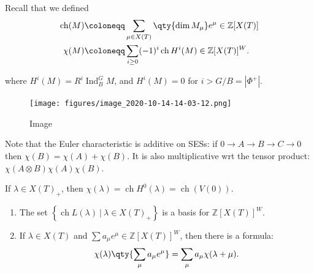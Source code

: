 Recall that we defined
\begin{align*}  
\operatorname{ch}(M) &\coloneqq\sum_{\mu \in X(T)} \qty{\dim M_\mu} e^{\mu} \in {\mathbb{Z}}[X(T)]\\
\chi(M) &\coloneqq\sum_{i\geq 0} (-1)^i \operatorname{ch}H^i(M) \in {\mathbb{Z}}[X(T)]^W
.\end{align*}

where \(H^i(M) = R^i \operatorname{Ind}_B^G M\), and \(H^i(M) =0\) for
\(i> G/B = {\left\lvert {\Phi^+} \right\rvert}\).

\begin{figure}
\centering
\texttt{[image: figures/image\_2020-10-14-14-03-12.png]}
\caption{Image}
\end{figure}

Note that the Euler characteristic is additive on SESs: if
\(0\to A\to B\to C\to 0\) then \(\chi(B) = \chi(A) + \chi(B)\). It is
also multiplicative wrt the tensor product:
\(\chi(A\otimes B) \chi(A) \chi(B)\).


\begin{remark}

If \(\lambda \in X(T)_+\), then
\(\chi(\lambda) = \operatorname{ch}H^0(\lambda) = \operatorname{ch}(V(0))\).

\end{remark}

\begin{proposition}[?]

\hfill

\begin{enumerate}
\def\labelenumi{\arabic{enumi}.}
\item
  The set
  \(\left\{{\operatorname{ch}L(\lambda) {~\mathrel{\Big|}~}\lambda\in X(T)_+}\right\}\)
  is a basis for \({\mathbb{Z}}[X(T)]^W\).
\item
  If \(\lambda \in X(T)\) and
  \(\sum a_\mu e^\mu \in {\mathbb{Z}}[X(T)]^W\), then there is a
  formula:
  \begin{align*}  
  \chi(\lambda) \qty{ \sum_\mu a_\mu e^\mu } = \sum_\mu a_\mu \chi(\lambda + \mu)
  .\end{align*}
\end{enumerate}

\end{proposition}

